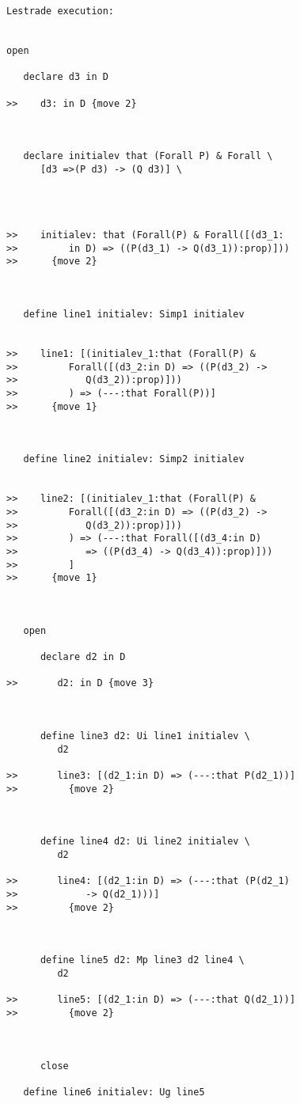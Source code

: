 \documentclass{slides}
\begin{document}
\begin{slide}
\begin{verbatim}Lestrade execution:


open

   declare d3 in D

>>    d3: in D {move 2}



   declare initialev that (Forall P) & Forall \
      [d3 =>(P d3) -> (Q d3)] \
      



>>    initialev: that (Forall(P) & Forall([(d3_1:
>>         in D) => ((P(d3_1) -> Q(d3_1)):prop)]))
>>      {move 2}



   define line1 initialev: Simp1 initialev


>>    line1: [(initialev_1:that (Forall(P) &
>>         Forall([(d3_2:in D) => ((P(d3_2) ->
>>            Q(d3_2)):prop)]))
>>         ) => (---:that Forall(P))]
>>      {move 1}



   define line2 initialev: Simp2 initialev


>>    line2: [(initialev_1:that (Forall(P) &
>>         Forall([(d3_2:in D) => ((P(d3_2) ->
>>            Q(d3_2)):prop)]))
>>         ) => (---:that Forall([(d3_4:in D)
>>            => ((P(d3_4) -> Q(d3_4)):prop)]))
>>         ]
>>      {move 1}



   open

      declare d2 in D

>>       d2: in D {move 3}



      define line3 d2: Ui line1 initialev \
         d2

>>       line3: [(d2_1:in D) => (---:that P(d2_1))]
>>         {move 2}



      define line4 d2: Ui line2 initialev \
         d2

>>       line4: [(d2_1:in D) => (---:that (P(d2_1)
>>            -> Q(d2_1)))]
>>         {move 2}



      define line5 d2: Mp line3 d2 line4 \
         d2

>>       line5: [(d2_1:in D) => (---:that Q(d2_1))]
>>         {move 2}



      close

   define line6 initialev: Ug line5


\end{verbatim}
\end{slide}
\end{document}
